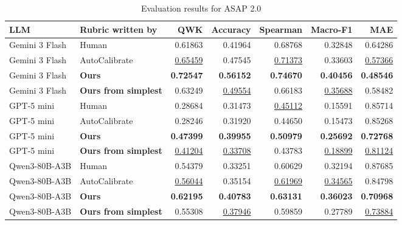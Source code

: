 \begin{table}[t]
\centering
\caption{Evaluation results for ASAP 2.0}
\begin{tabular}{llrrrrr}
\toprule
LLM & Rubric written by & QWK & Accuracy & Spearman & Macro-F1 & MAE \\
\midrule
Gemini 3 Flash & Human & 0.61863 & 0.41964 & 0.68768 & 0.32848 & 0.64286 \\
Gemini 3 Flash & AutoCalibrate & \underline{0.65459} & 0.47545 & \underline{0.71373} & 0.33603 & \underline{0.57366} \\
Gemini 3 Flash & \textbf{Ours} & \textbf{0.72547} & \textbf{0.56152} & \textbf{0.74670} & \textbf{0.40456} & \textbf{0.48546} \\
Gemini 3 Flash & \textbf{Ours from simplest} & 0.63249 & \underline{0.49554} & 0.66183 & \underline{0.35688} & 0.58482 \\
\midrule
GPT-5 mini & Human & 0.28684 & 0.31473 & \underline{0.45112} & 0.15591 & 0.85714 \\
GPT-5 mini & AutoCalibrate & 0.28246 & 0.31920 & 0.44650 & 0.15473 & 0.85268 \\
GPT-5 mini & \textbf{Ours} & \textbf{0.47399} & \textbf{0.39955} & \textbf{0.50979} & \textbf{0.25692} & \textbf{0.72768} \\
GPT-5 mini & \textbf{Ours from simplest} & \underline{0.41204} & \underline{0.33708} & 0.43783 & \underline{0.18899} & \underline{0.81124} \\
\midrule
Qwen3-80B-A3B & Human & 0.54379 & 0.33251 & 0.60629 & 0.32194 & 0.87685 \\
Qwen3-80B-A3B & AutoCalibrate & \underline{0.56044} & 0.35154 & \underline{0.61969} & \underline{0.34565} & 0.84798 \\
Qwen3-80B-A3B & \textbf{Ours} & \textbf{0.62195} & \textbf{0.40783} & \textbf{0.63131} & \textbf{0.36023} & \textbf{0.70968} \\
Qwen3-80B-A3B & \textbf{Ours from simplest} & 0.55308 & \underline{0.37946} & 0.59859 & 0.27789 & \underline{0.73884} \\
\bottomrule
\end{tabular}
\end{table}

